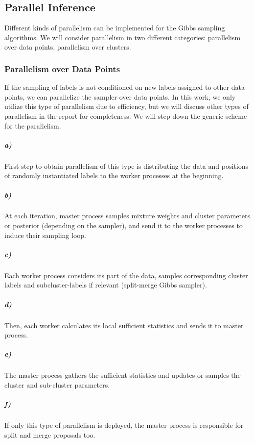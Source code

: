 \documentclass[12pt, a4paper]{article}
\begin{document}
\subsection{Parallel Inference} \label{sec:parallelinf}
Different kinds of parallelism can be implemented for the Gibbs sampling algorithms. We will consider parallelism in two different categories: parallelism over data points, parallelism over clusters. 

% 

\subsubsection{Parallelism over Data Points}
If the sampling of labels is not conditioned on new labels assigned to other data points, we can parallelize the sampler over data points. In this work, we only utilize this type of parallelism due to efficiency, but we will discuss other types of parallelism in the report for completeness. We will step down the generic scheme for the parallelism.

\subparagraph{a)} First step to obtain parallelism of this type is distributing the data and positions of randomly instantiated labels to the worker processes at the beginning. 

\subparagraph{b)}  At each iteration, master process samples mixture weights and cluster parameters or posterior (depending on the sampler), and send it to the worker processes to induce their sampling loop.


\subparagraph{c)}  Each worker process considers its part of the data, samples corresponding cluster labels and subcluster-labels if relevant (split-merge Gibbs sampler). 

\subparagraph{d)}  Then, each worker calculates its local sufficient statistics and sends it to master process. 

\subparagraph{e)}  The master process gathers the sufficient statistics and updates or samples the cluster and sub-cluster parameters.

\subparagraph{f)}  If only this type of parallelism is deployed, the master process is responsible for split and merge proposals too.
\end{document}
